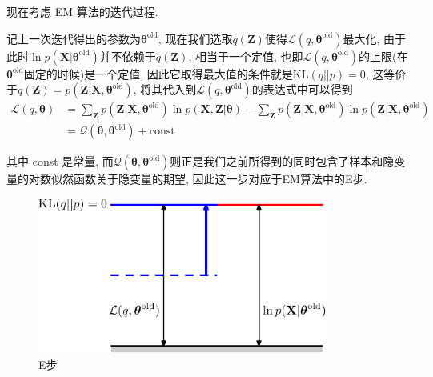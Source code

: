 \documentclass[a4paper,UTF8]{ctexart}
\theoremstyle{plain} \newtheorem{theorem}{定理}[section]
\theoremstyle{plain} \newtheorem{definition}{定义}[section]
\theoremstyle{plain} \newtheorem{lemma}{引理}[section]
\theoremstyle{plain} \newtheorem{proposition}{命题}[section]
\theoremstyle{plain} \newtheorem{example}{例}
\theoremstyle{plain} \newtheorem{remark}{注}
\theoremstyle{plain} \newtheorem{corollary}{推论}[section]
\begin{document}
现在考虑 EM 算法的迭代过程.

记上一次迭代得出的参数为$\bm{\theta}^{\mathrm{old}}$, 现在我们选取$q(\bm{Z})$使得$\mathcal{L}(q, \bm{\theta}^{\mathrm{old}})$最大化, 由于此时$\ln p(\bm{X} | \bm{\theta}^{\mathrm{old}})$并不依赖于$q(\bm{Z})$, 相当于一个定值, 也即$\mathcal{L}(q, \bm{\theta}^{\mathrm{old}})$的上限(在$\bm{\theta}^{\mathrm{old}}$固定的时候)是一个定值, 因此它取得最大值的条件就是$\mathrm{KL}(q || p) = 0$, 这等价于$q(\bm{Z}) = p(\bm{Z} | \bm{X}, \bm{\theta}^{\mathrm{old}})$, 将其代入到$\mathcal{L}(q, \bm{\theta}^{\mathrm{old}})$的表达式中可以得到
\begin{align*}
\mathcal{L} (q, \bm{\theta}) & = \sum_{\bm{Z}} p(\bm{Z} | \bm{X}, \bm{\theta}^{\mathrm{old}}) \ln p(\bm{X}, \bm{Z} | \bm{\theta}) - \sum_{\bm{Z}} p(\bm{Z} | \bm{X}, \bm{\theta}^{\mathrm{old}}) \ln p(\bm{Z} | \bm{X}, \bm{\theta}^{\mathrm{old}}) \\ 
& = \mathcal{Q}(\bm{\theta}, \bm{\theta}^{\mathrm{old}}) + \mathrm{const}
\end{align*}

其中 const 是常量, 而$\mathcal{Q}(\bm{\theta}, \bm{\theta}^{\mathrm{old}})$则正是我们之前所得到的同时包含了样本和隐变量的对数似然函数关于隐变量的期望, 因此这一步对应于EM算法中的E步.
\begin{figure}[!htb]
	\centering
	\includegraphics[width=0.85\textwidth]{kld2.pdf}
	\caption{E步}
	\label{kld2}
\end{figure}
\end{document}
